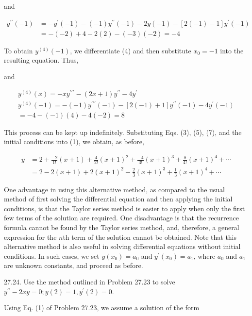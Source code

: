 \documentclass[10pt]{article}
\begin{document}
and


\begin{align*}
y^{\prime \prime}(-1) & =-y^{\prime}(-1)-(-1) y^{\prime \prime}(-1)-2 y(-1)-[2(-1)-1] y^{\prime}(-1) \\
& =-(-2)+4-2(2)-(-3)(-2)=-4 \tag{5}
\end{align*}


To obtain $y^{(4)}(-1)$, we differentiate (4) and then substitute $x_{0}=-1$ into the resulting equation. Thus,

and


\begin{gather*}
y^{(4)}(x)=-x y^{\prime \prime \prime}-(2 x+1) y^{\prime \prime}-4 y^{\prime}  \tag{6}\\
y^{(4)}(-1)=-(-1) y^{\prime \prime \prime}(-1)-[2(-1)+1] y^{\prime \prime}(-1)-4 y^{\prime}(-1) \\
=-4-(-1)(4)-4(-2)=8 \tag{7}
\end{gather*}


This process can be kept up indefinitely. Substituting Eqs. (3), (5), (7), and the initial conditions into (1), we obtain, as before,

$$
\begin{aligned}
y & =2+\frac{-2}{1 !}(x+1)+\frac{4}{2 !}(x+1)^{2}+\frac{-4}{3 !}(x+1)^{3}+\frac{8}{4 !}(x+1)^{4}+\cdots \\
& =2-2(x+1)+2(x+1)^{2}-\frac{2}{3}(x+1)^{3}+\frac{1}{3}(x+1)^{4}+\cdots
\end{aligned}
$$

One advantage in using this alternative method, as compared to the usual method of first solving the differential equation and then applying the initial conditions, is that the Taylor series method is easier to apply when only the first few terms of the solution are required. One disadvantage is that the recurrence formula cannot be found by the Taylor series method, and, therefore, a general expression for the $n$th term of the solution cannot be obtained. Note that this alternative method is also useful in solving differential equations without initial conditions. In such cases, we set $y\left(x_{0}\right)=a_{0}$ and $y^{\prime}\left(x_{0}\right)=a_{1}$, where $a_{0}$ and $a_{1}$ are unknown constants, and proceed as before.

27.24. Use the method outlined in Problem 27.23 to solve $y^{\prime \prime}-2 x y=0 ; y(2)=1, y^{\prime}(2)=0$.

Using Eq. (1) of Problem 27.23, we assume a solution of the form
\end{document}
